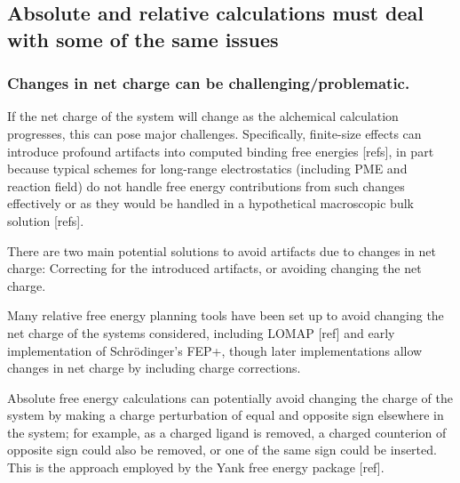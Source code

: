 \documentclass[9pt,bestpractices]{livecoms}
\begin{document}



\subsection{Absolute and relative calculations must deal with some of the same issues}

\subsubsection{Changes in net charge can be challenging/problematic.}

If the net charge of the system will change as the alchemical calculation progresses, this can pose major challenges.
Specifically, finite-size effects can introduce profound artifacts into computed binding free energies [refs], in part because typical schemes for long-range electrostatics (including PME and reaction field) do not handle free energy contributions from such changes effectively or as they would be handled in a hypothetical macroscopic bulk solution [refs].

There are two main potential solutions to avoid artifacts due to changes in net charge: Correcting for the introduced artifacts, or avoiding changing the net charge.

Many relative free energy planning tools have been set up to avoid changing the net charge of the systems considered, including LOMAP [ref] and early implementation of Schr\"{o}dinger's FEP+, though later implementations allow changes in net charge by including charge corrections.

Absolute free energy calculations can potentially avoid changing the charge of the system by making a charge perturbation of equal and opposite sign elsewhere in the system; for example, as a charged ligand is removed, a charged counterion of opposite sign could also be removed, or one of the same sign could be inserted.
This is the approach employed by the Yank free energy package [ref].
\end{document}
